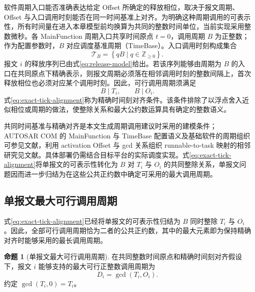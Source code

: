\documentclass[UTF8,a4paper,twoside,zihao=-4]{ctexart}
\numberwithin{equation}{section}
\numberwithin{figure}{section}
\numberwithin{table}{section}
\theoremstyle{definition}
\newtheorem{proposition}{命题}
\numberwithin{algocf}{section}
\begin{document}
软件周期入口能否准确表达给定 Offset 所确定的释放相位，取决于报文周期、Offset 与入口调用时刻能否在同一时间基准上对齐。为明确这种周期调用的可表示性，所有时间量在进入本章模型前均换算为共同的整数时间单位，当前实现采用整数微秒。各 MainFunction 周期入口共享时间原点 $t=0$，调用周期 $B$ 为正整数；作为配置参数时，$B$ 对应调度基准周期（TimeBase）。入口调用时刻构成集合
\begin{equation}
 \mathcal T_B
 =
 \left\{qB\mid q\in\mathbb Z_{\ge 0}\right\}.
\label{eq:main-function-tick-set}
\end{equation}
报文 $i$ 的释放序列已由式\eqref{eq:release-model}给出。若该序列能够由周期为 $B$ 的入口在共同原点下精确表示，则报文周期必须落在相邻调用时刻的整数间隔上，首次释放相位也必须对应某个调用时刻。因此，可行调用周期须满足
\begin{equation}
 B\mid T_i,
 \qquad
 B\mid O_i.
\label{eq:exact-tick-alignment}
\end{equation}
式\eqref{eq:exact-tick-alignment}称为精确时间刻对齐条件。该条件排除了以浮点舍入近似相位或周期的做法，使整除关系和最大公约数运算具有确定的整数语义。

共同时间基准与精确对齐是本文生成周期调用建议时采用的建模条件；AUTOSAR COM 的 MainFunction 与 TimeBase 配置语义及基础软件的周期组织可参见文献\cite{autosarcom,zhang2011autosar,denil2011devs}，利用 activation Offset 与 gcd 关系组织 runnable-to-task 映射的相邻研究见文献\cite{khenfri2015,khenfri2020}。具体部署仍需结合目标平台的实际调度实现。式\eqref{eq:exact-tick-alignment}将单报文的可表示性转化为 $B$ 对 $T_i$ 与 $O_i$ 的共同整除关系，单报文问题因而进一步归结为在这些公共正约数中确定可采用的最大调用周期。

\subsection{单报文最大可行调用周期}
\label{subsec:message-max-tick}

式\eqref{eq:exact-tick-alignment}已经将单报文的可表示性归结为 $B$ 同时整除 $T_i$ 与 $O_i$。因此，全部可行调用周期恰为二者的公共正约数，其中的最大元素即为保持精确对齐时能够采用的最长调用周期。

\begin{proposition}[单报文最大可行调用周期]
\label{prop:message-max-tick}
在共同整数时间原点和精确时间刻对齐假设下，报文 $i$ 能够支持的最大可行正整数调用周期为
\begin{equation}
 D_i
 =
 \gcd(T_i,O_i).
\label{eq:message-max-tick}
\end{equation}
约定 $\gcd(T_i,0)=T_i$。
\end{proposition}
\end{document}
